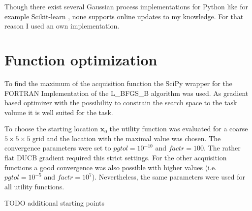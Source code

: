 \documentclass[11pt,a4paper,twoside,BCOR=15mm]{scrreprt}
\newcommand{\vc}[1]{\bm{#1}}
\begin{document}
Though there exist several Gaussian process implementations for Python like for 
example Scikit-learn \parencite[i.e.][]{scikit-learn}, none supports online 
updates to my knowledge.  For that reason I used an own implementation.

\section{Function optimization}
To find the maximum of the acquisition function the SciPy wrapper for the 
FORTRAN Implementation of the L\_BFGS\_B algorithm \parencite{Byrd:2006iv, 
    Zhu:1997br} was used. As gradient based optimizer with the possibility to 
constrain the search space to the task volume it is well suited for the task.

To choose the starting location $\vc x_0$ the utility function was evaluated for 
a coarse $5 \times 5 \times 5$ grid and the location with the maximal value was 
chosen. The convergence parameters were set to $\mathit{pgtol} = 10^{-10}$ and 
$\mathit{factr} = 100$. The rather flat DUCB gradient required this strict 
settings. For the other acquisition functions a good convergence was also 
possible with higher values (i.e.~$\mathit{pgtol} = 10^{-5}$ and $\mathit{factr} 
= 10^7$).  Nevertheless, the same parameters were used for all utility 
functions.

TODO additional starting points
\end{document}
